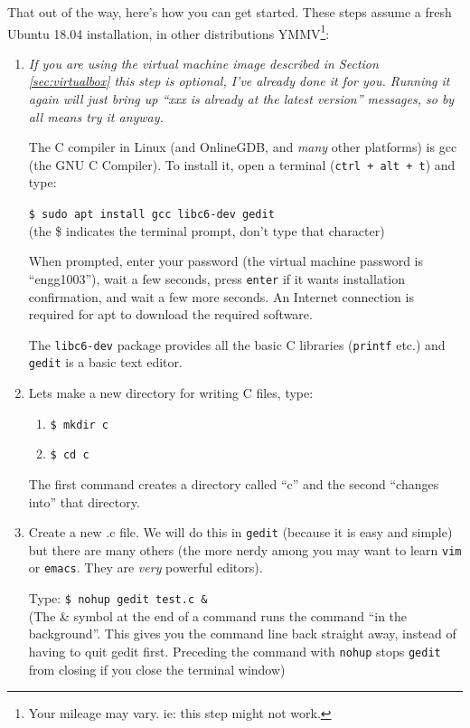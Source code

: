 \documentclass{lab}
\begin{document}
That out of the way, here's how you can get started. These steps assume a fresh Ubuntu 18.04 installation, in other distributions YMMV\footnote{Your mileage may vary. ie: this step might not work.}:

\begin{enumerate}
\item \textit{If you are using the virtual machine image described in Section \ref{sec:virtualbox} this step is optional, I've already done it for you. Running it again will just bring up ``xxx is already at the latest version'' messages, so by all means try it anyway.}

The C compiler in Linux (and OnlineGDB, and \textit{many} other platforms) is gcc (the GNU C Compiler). To install it, open a terminal (\texttt{ctrl + alt + t}) and type:

\texttt{\$ sudo apt install gcc libc6-dev gedit}\\ (the \$ indicates the terminal prompt, don't type that character)

When prompted, enter your password (the virtual machine password is ``engg1003''), wait a few seconds, press \texttt{enter} if it wants installation confirmation, and wait a few more seconds. An Internet connection is required for apt to download the required software.

The \texttt{libc6-dev} package provides all the basic C libraries (\texttt{printf} etc.) and \texttt{gedit} is a basic text editor.

\item Lets make a new directory for writing C files, type:
\begin{enumerate}
	\item \texttt{\$ mkdir c}
	\item \texttt{\$ cd c}
\end{enumerate}
The first command creates a directory called ``c'' and the second ``changes into'' that directory.

\item Create a new .c file. We will do this in \texttt{gedit} (because it is easy and simple) but there are many others (the more nerdy among you may want to learn \texttt{vim} or \texttt{emacs}. They are \textit{very} powerful editors).

Type: \texttt{\$ nohup gedit test.c \&} \\ (The \& symbol at the end of a command runs the command ``in the background''. This gives you the command line back straight away, instead of having to quit gedit first. Preceding the command with \texttt{nohup} stops \texttt{gedit} from closing if you close the terminal window)


\end{enumerate}
\end{document}
